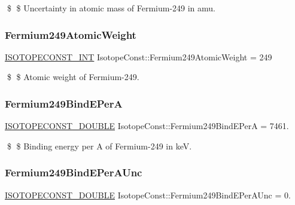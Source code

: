 \$ \$ Uncertainty in atomic mass of Fermium-\/249 in amu. \mbox{\label{group___isotope_const-_fermium-_fm249_gae81c6038e7879967b7221a6527bb5c49}} 
\subsubsection{\texorpdfstring{Fermium249\+Atomic\+Weight}{Fermium249AtomicWeight}}
{\footnotesize\ttfamily \mbox{\hyperlink{group___isotope_const-_macros_ga5f18360b3e99483a35c32d789e62621c}{I\+S\+O\+T\+O\+P\+E\+C\+O\+N\+S\+T\+\_\+\+I\+NT}} Isotope\+Const\+::\+Fermium249\+Atomic\+Weight = 249}

\$ \$ Atomic weight of Fermium-\/249. \mbox{\label{group___isotope_const-_fermium-_fm249_ga205230c3aeae20beb3e31f056f701550}} 
\subsubsection{\texorpdfstring{Fermium249\+Bind\+E\+PerA}{Fermium249BindEPerA}}
{\footnotesize\ttfamily \mbox{\hyperlink{group___isotope_const-_macros_ga8f45a7272ce02c0b4c65c44636ed719a}{I\+S\+O\+T\+O\+P\+E\+C\+O\+N\+S\+T\+\_\+\+D\+O\+U\+B\+LE}} Isotope\+Const\+::\+Fermium249\+Bind\+E\+PerA = 7461.}

\$ \$ Binding energy per A of Fermium-\/249 in keV. \mbox{\label{group___isotope_const-_fermium-_fm249_gad92ac8cb6a7e59b8cc06a54782f1954f}} 
\subsubsection{\texorpdfstring{Fermium249\+Bind\+E\+Per\+A\+Unc}{Fermium249BindEPerAUnc}}
{\footnotesize\ttfamily \mbox{\hyperlink{group___isotope_const-_macros_ga8f45a7272ce02c0b4c65c44636ed719a}{I\+S\+O\+T\+O\+P\+E\+C\+O\+N\+S\+T\+\_\+\+D\+O\+U\+B\+LE}} Isotope\+Const\+::\+Fermium249\+Bind\+E\+Per\+A\+Unc = 0.}

